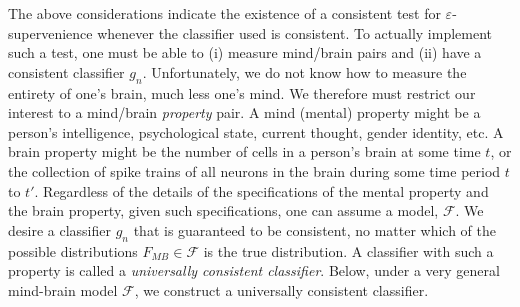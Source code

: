 \documentclass{article}
\newcommand{\conv}{\rightarrow}
\newcommand{\eps}{\varepsilon}
\providecommand{\mc}[1]{\mathcal{#1}}
\newcommand{\hL}{\widehat{L}}
\begin{document}
The above considerations indicate the existence of a consistent test for $\eps$-supervenience whenever the classifier used is consistent.  
To actually implement such a test, one must be able to (i) measure mind/brain pairs and (ii) have a consistent classifier $g_n$.  Unfortunately, we do not know how to measure the entirety of one's brain, much less one's mind. 
We therefore must restrict our interest to a mind/brain \emph{property} pair.  
A mind (mental) property might be a person's intelligence, psychological state, current thought, gender identity, etc.  A brain property might be the number of cells in a person's brain at some time $t$, or the collection of spike trains of all neurons in the brain during some time period $t$ to $t'$.  Regardless of the details of the specifications of the mental property and the brain property, given such specifications, one can assume a model, $\mc{F}$.  We desire a classifier $g_n$ that is guaranteed to be consistent, no matter which of the possible distributions $F_{MB} \in \mc{F}$ is the true distribution.  A classifier with such a property is called a \emph{universally consistent classifier}.  
Below, under a very general mind-brain model $\mc{F}$, we construct a universally consistent classifier. 


\end{document}
